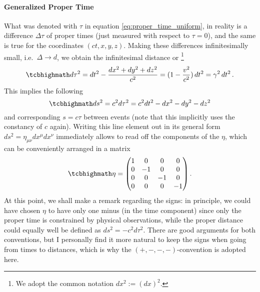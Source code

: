 		\paragraph{Generalized Proper Time}
What was denoted with $\tau$ in equation \eqref{eq:proper_time_uniform}, in reality is a difference $\Delta \tau$ of proper times (just measured with respect to $\tau = 0$), and the same is true for the coordinates $(ct, x, y, z)$. Making these differences infinitesimally small, i.e.~$\Delta \rightarrow d$, we obtain the infinitesimal distance or \footnote{We adopt the common notation $dx^2 := (dx)^2$.}
\begin{equation}
	\eqbox{
	d\tau^2 = dt^2 - \frac{dx^2 + dy^2 + dz^2}{c^2} = (1 - \frac{v^2}{c^2}) \, dt^2 = \gamma^2 \, dt^2
	} \, .
\end{equation}
This implies the following 
\begin{equation}
	\eqbox{
	ds^2 = c^2 d\tau^2 = c^2 dt^2 - dx^2 - dy^2 - dz^2
	}
\end{equation}
and corresponding  $s = c \tau$ between events (note that this implicitly uses the constancy of $c$ again). Writing this line element out in its general form $ds^2 = \eta_{\mu \nu} dx^\mu dx^\nu$ immediately allows to read off the components of the  $\eta$, which can be conveniently arranged in a matrix
\begin{equation}
	\eqbox{
	\eta = \mqty(1 & 0 & 0 & 0 \\ 0 & -1 & 0 & 0 \\ 0 & 0 & -1 & 0 \\ 0 & 0 & 0 & -1)
	} \, .
\end{equation}
At this point, we shall make a remark regarding the signs: in principle, we could have chosen $\eta$ to have only one minus (in the time component) since only the proper time is constrained by physical observations, while the proper distance could equally well be defined as $ds^2 = - c^2 d\tau^2$. There are good arguments for both conventions, but I personally find it more natural to keep the signs when going from times to distances, which is why the $(+, -, -, -)$-convention is adopted here.\\



